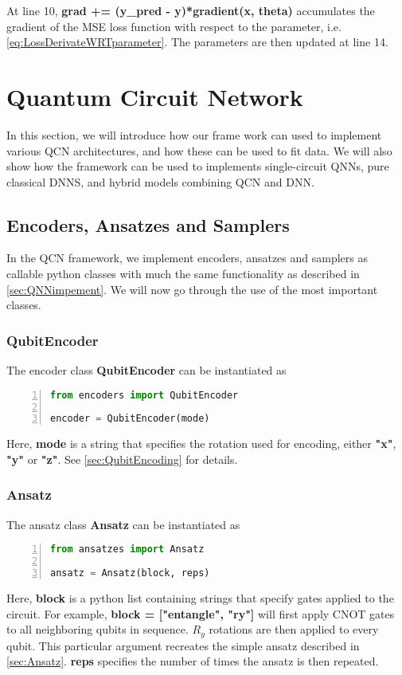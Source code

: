 At line 10, \textbf{grad += (y\_pred - y)*gradient(x, theta)} accumulates the gradient of the MSE loss function with respect to the parameter, i.e. \cref{eq:LossDerivateWRTparameter}. The parameters are then updated at line 14.


\section{Quantum Circuit Network}\label{sec:QCNimplementation}
In this section, we will introduce how our frame work can used to implement various QCN architectures, and how these can be used to fit data. We will also show how the framework can be used to implements single-circuit QNNs, pure classical DNNS, and hybrid models combining QCN and DNN. 

\subsection{Encoders, Ansatzes and Samplers}\label{sec:EAaS}
In the QCN framework, we implement encoders, ansatzes and samplers as callable python classes with much the same functionality as described in \cref{sec:QNNimpement}. We will now go through the use of the most important classes.

\subsubsection*{QubitEncoder}
The encoder class \textbf{QubitEncoder} can be instantiated as 

\begin{lstlisting}[language=python, numbers=left]
from encoders import QubitEncoder

encoder = QubitEncoder(mode)
\end{lstlisting}

Here, \textbf{mode} is a string that specifies the rotation used for encoding, either \textbf{"x"}, \textbf{"y"} or \textbf{"z"}. See \cref{sec:QubitEncoding} for details.

\subsubsection*{Ansatz}
The ansatz class \textbf{Ansatz} can be instantiated as
\begin{lstlisting}[language=python, numbers=left]
from ansatzes import Ansatz

ansatz = Ansatz(block, reps)
\end{lstlisting}
Here, \textbf{block} is a python list containing strings that specify gates applied to the circuit. For example, 
\textbf{block = ["entangle", "ry"]} will first apply CNOT gates to all neighboring qubits in sequence. $R_y$ rotations are then applied to every qubit. This particular argument recreates the simple ansatz described in \cref{sec:Ansatz}. \textbf{reps} specifies the number of times the ansatz is then repeated.

